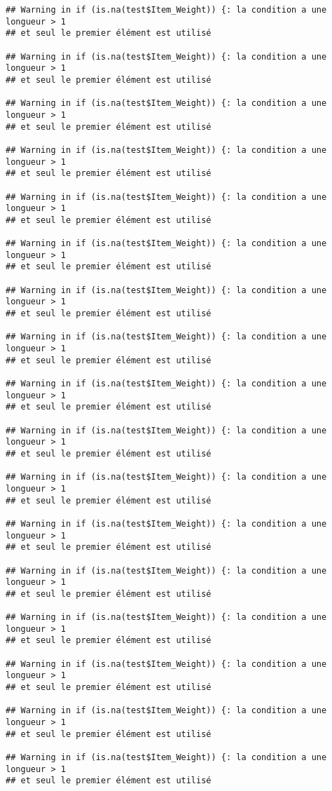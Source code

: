 \documentclass[]{article}
\begin{document}
\begin{verbatim}
## Warning in if (is.na(test$Item_Weight)) {: la condition a une longueur > 1
## et seul le premier élément est utilisé

## Warning in if (is.na(test$Item_Weight)) {: la condition a une longueur > 1
## et seul le premier élément est utilisé

## Warning in if (is.na(test$Item_Weight)) {: la condition a une longueur > 1
## et seul le premier élément est utilisé

## Warning in if (is.na(test$Item_Weight)) {: la condition a une longueur > 1
## et seul le premier élément est utilisé

## Warning in if (is.na(test$Item_Weight)) {: la condition a une longueur > 1
## et seul le premier élément est utilisé

## Warning in if (is.na(test$Item_Weight)) {: la condition a une longueur > 1
## et seul le premier élément est utilisé

## Warning in if (is.na(test$Item_Weight)) {: la condition a une longueur > 1
## et seul le premier élément est utilisé

## Warning in if (is.na(test$Item_Weight)) {: la condition a une longueur > 1
## et seul le premier élément est utilisé

## Warning in if (is.na(test$Item_Weight)) {: la condition a une longueur > 1
## et seul le premier élément est utilisé

## Warning in if (is.na(test$Item_Weight)) {: la condition a une longueur > 1
## et seul le premier élément est utilisé

## Warning in if (is.na(test$Item_Weight)) {: la condition a une longueur > 1
## et seul le premier élément est utilisé

## Warning in if (is.na(test$Item_Weight)) {: la condition a une longueur > 1
## et seul le premier élément est utilisé

## Warning in if (is.na(test$Item_Weight)) {: la condition a une longueur > 1
## et seul le premier élément est utilisé

## Warning in if (is.na(test$Item_Weight)) {: la condition a une longueur > 1
## et seul le premier élément est utilisé

## Warning in if (is.na(test$Item_Weight)) {: la condition a une longueur > 1
## et seul le premier élément est utilisé

## Warning in if (is.na(test$Item_Weight)) {: la condition a une longueur > 1
## et seul le premier élément est utilisé

## Warning in if (is.na(test$Item_Weight)) {: la condition a une longueur > 1
## et seul le premier élément est utilisé


\end{verbatim}
\end{document}
